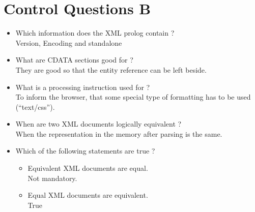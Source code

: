 \section{Control Questions B}
\begin{itemize}
\item Which information does the XML prolog contain ?\\
Version, Encoding and standalone
\item What are CDATA sections good for ?\\
They are good so that the entity reference can be left beside.
\item What is a processing instruction used for ?\\
To inform the browser, that some special type of formatting has to be used ("`text/css"').
\item When are two XML documents logically equivalent ?\\
When the representation in the memory after parsing is the same.
\item Which of the following statements are true ?
\begin{itemize}
\item Equivalent XML documents are equal.\\
Not mandatory.
\item Equal XML documents are equivalent.\\
True
\end{itemize}
\end{itemize}
